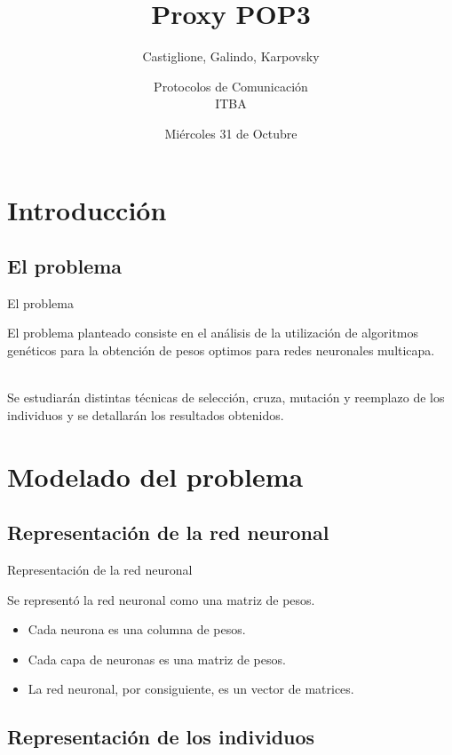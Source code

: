 \documentclass{beamer}
\title{Proxy POP3}
\subtitle{Castiglione, Galindo, Karpovsky}
\author{Protocolos de Comunicación\\ \small ITBA}
\date{Miércoles 31 de Octubre}
\begin{document}
\frame{\titlepage}

\section[Outline]{}
\frame{\tableofcontents}

\section{Introducción}
\subsection{El problema}
\begin{frame}{El problema}

\par El problema planteado consiste en el análisis de la utilización de algoritmos genéticos para la obtención de pesos optimos para redes neuronales multicapa.\\
\ \\

\par Se estudiarán distintas técnicas de selección, cruza, mutación y reemplazo de los individuos y se detallarán los resultados obtenidos.

\end{frame}

\section{Modelado del problema}
\subsection{Representación de la red neuronal}

\begin{frame}{Representación de la red neuronal}
\par Se representó la red neuronal como una matriz de pesos. \\
\begin{itemize}
\item Cada neurona es una columna de pesos.
\item Cada capa de neuronas es una matriz de pesos.
\item La red neuronal, por consiguiente, es un vector de matrices.
\end{itemize}
\end{frame}

\subsection{Representación de los individuos}
\end{document}
